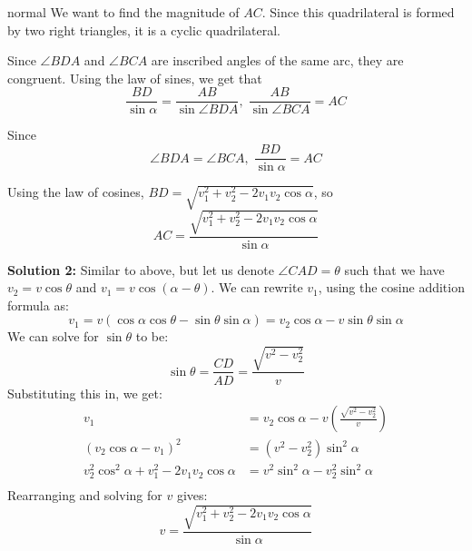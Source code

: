 \begin{solution}{normal}
We want to find the magnitude of $AC$. Since this quadrilateral is formed by two right triangles, it is a cyclic quadrilateral.\vspace{3mm}

Since $\angle BDA$ and $\angle BCA$ are inscribed angles of the same arc, they are congruent. Using the law of sines, we get that $$\dfrac{BD}{\sin\alpha}=\dfrac{AB}{\sin\angle BDA},\;\dfrac{AB}{\sin\angle BCA}=AC$$\vspace{3mm}

Since $$\angle BDA=\angle BCA,\;\dfrac{BD}{\sin\alpha}=AC$$

Using the law of cosines, $BD=\sqrt{v_1^2+v_2^2-2v_1v_2\cos\alpha}$, so $$AC=\boxed{\dfrac{\sqrt{v_1^2+v_2^2-2v_1v_2\cos\alpha}}{\sin\alpha}}$$

\tcbline
\textbf{Solution 2:} Similar to above, but let us denote $\angle CAD=\theta$ such that we have $v_2=v\cos\theta$ and $v_1=v\cos(\alpha-\theta)$. We can rewrite $v_1$, using the cosine addition formula as:
$$v_1=v\left(\cos\alpha\cos\theta-\sin\theta\sin\alpha\right)=v_2\cos\alpha-v\sin\theta\sin\alpha$$
We can solve for $\sin\theta$ to be:
$$\sin\theta = \frac{CD}{AD}=\frac{\sqrt{v^2-v_2^2}}{v}$$
Substituting this in, we get:
\begin{align*}
v_1 &= v_2\cos\alpha-v\left(\frac{\sqrt{v^2-v_2^2}}{v}\right) \\
(v_2\cos\alpha-v_1)^2&=(v^2-v_2^2)\sin^2\alpha \\
v_2^2\cos^2\alpha+v_1^2-2v_1v_2\cos\alpha &= v^2\sin^2\alpha-v_2^2\sin^2\alpha \\
\end{align*}
Rearranging and solving for $v$ gives:
$$v=\boxed{\frac{\sqrt{v_1^2+v_2^2-2v_1v_2\cos\alpha}}{\sin\alpha}}$$
\end{solution}